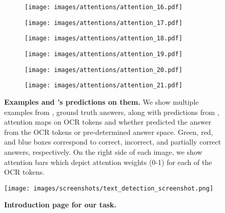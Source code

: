 \documentclass[10pt,twocolumn,letterpaper]{article}
\begin{document}
\begin{figure*}\ContinuedFloat
    \centering
    \begin{subfigure}[t]{0.32\textwidth}
        \texttt{[image: images/attentions/attention\_16.pdf]}
        \caption{}
        \label{fig:attention_16}
    \end{subfigure}
    \begin{subfigure}[t]{0.32\textwidth}
        \texttt{[image: images/attentions/attention\_17.pdf]}
        \caption{}
        \label{fig:attention_17}
    \end{subfigure}
    \begin{subfigure}[t]{0.32\textwidth}
        \texttt{[image: images/attentions/attention\_18.pdf]}
        \caption{}
        \label{fig:attention_18}
    \end{subfigure}
    \begin{subfigure}[t]{0.32\textwidth}
        \texttt{[image: images/attentions/attention\_19.pdf]}
        \caption{}
        \label{fig:attention_19}
    \end{subfigure}
    \begin{subfigure}[t]{0.32\textwidth}
        \texttt{[image: images/attentions/attention\_20.pdf]}
        \caption{}
        \label{fig:attention_20}
    \end{subfigure}
    \begin{subfigure}[t]{0.32\textwidth}
        \texttt{[image: images/attentions/attention\_21.pdf]}
        \caption{}
        \label{fig:attention_21}
    \end{subfigure}
    \caption{\textbf{\datasetName Examples and \approachNameShort's predictions on them.} We show multiple examples from \datasetName, ground truth answers, along with predictions from \approachNameShort, attention maps on OCR tokens and whether \approachNameShort predicted the answer from the OCR tokens or pre-determined answer space. 
    Green, red, and blue boxes correspond to correct, incorrect, and partially correct answers, respectively. On the right side of each image, we show attention bars which depict attention weights (0-1) for each of the OCR tokens.}
    
    \label{fig:attention_total}
\end{figure*}
\begin{figure*}[h!]
    \centering
    \texttt{[image: images/screenshots/text\_detection\_screenshot.png]}
    \caption{\textbf{Introduction page for our task.}
    }
    \label{fig:text_detection_entrance}
\end{figure*}
\end{document}
